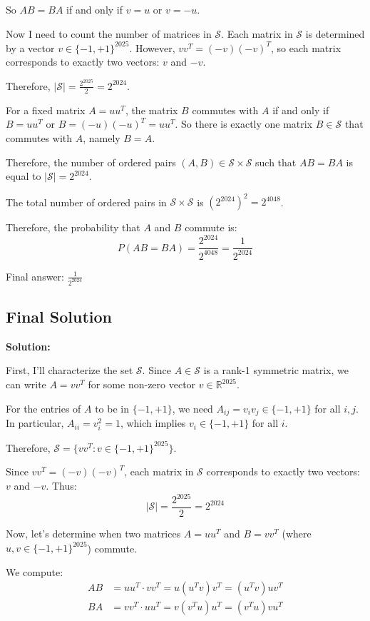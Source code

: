 \documentclass[12pt,a4paper]{article}
\theoremstyle{definition}
\begin{document}
    So $AB = BA$ if and only if $v = u$ or $v = -u$.

    Now I need to count the number of matrices in $\mathcal{S}$. Each matrix in $\mathcal{S}$ is determined by a vector $v \in \{-1, +1\}^{2025}$. However, $vv^T = (-v)(-v)^T$, so each matrix corresponds to exactly two vectors: $v$ and $-v$.

    Therefore, $|\mathcal{S}| = \frac{2^{2025}}{2} = 2^{2024}$.

    For a fixed matrix $A = uu^T$, the matrix $B$ commutes with $A$ if and only if $B = uu^T$ or $B = (-u)(-u)^T = uu^T$. So there is exactly one matrix $B \in \mathcal{S}$ that commutes with $A$, namely $B = A$.

    Therefore, the number of ordered pairs $(A, B) \in \mathcal{S} \times \mathcal{S}$ such that $AB = BA$ is equal to $|\mathcal{S}| = 2^{2024}$.

    The total number of ordered pairs in $\mathcal{S} \times \mathcal{S}$ is $(2^{2024})^2 = 2^{4048}$.

    Therefore, the probability that $A$ and $B$ commute is:
    $$P(AB = BA) = \frac{2^{2024}}{2^{4048}} = \frac{1}{2^{2024}}$$

    Final answer: $\frac{1}{2^{2024}}$
\subsection{Final Solution}
    \textbf{Solution:}

    First, I'll characterize the set $\mathcal{S}$. Since $A \in \mathcal{S}$ is a rank-1 symmetric matrix, we can write $A = vv^T$ for some non-zero vector $v \in \mathbb{R}^{2025}$.

    For the entries of $A$ to be in $\{-1, +1\}$, we need $A_{ij} = v_iv_j \in \{-1, +1\}$ for all $i,j$. In particular, $A_{ii} = v_i^2 = 1$, which implies $v_i \in \{-1, +1\}$ for all $i$.

    Therefore, $\mathcal{S} = \{vv^T : v \in \{-1, +1\}^{2025}\}$.

    Since $vv^T = (-v)(-v)^T$, each matrix in $\mathcal{S}$ corresponds to exactly two vectors: $v$ and $-v$. Thus:
    $$|\mathcal{S}| = \frac{2^{2025}}{2} = 2^{2024}$$

    Now, let's determine when two matrices $A = uu^T$ and $B = vv^T$ (where $u, v \in \{-1, +1\}^{2025}$) commute.

    We compute:
    \begin{align}
        AB &= uu^T \cdot vv^T = u(u^Tv)v^T = (u^Tv)uv^T\\
        BA &= vv^T \cdot uu^T = v(v^Tu)u^T = (v^Tu)vu^T
    \end{align}
\end{document}
